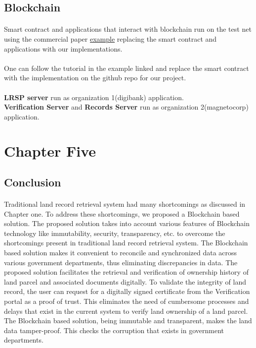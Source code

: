 \documentclass{article}
\begin{document}
        \subsection{Blockchain}
    
        \paragraph{}
        Smart contract and applications that interact with blockchain run on the test net using the commercial paper \href{https://hyperledger-fabric.readthedocs.io/en/latest/tutorial/commercial_paper.html}{example} replacing the smart contract and applications with our implementations.
        
        \paragraph{}
        One can follow the tutorial in the example linked and replace the smart contract with the implementation on the github repo for our project.\\
        \\
        \textbf{LRSP server} run as organization 1(digibank) application.\\
        \textbf{Verification Server} and \textbf{Records Server} run as organization 2(magnetocorp) application.
    

    \section{Chapter Five}
        \subsection{Conclusion}
            \paragraph{}
            Traditional land record retrieval system had many shortcomings as discussed in Chapter one. To address these shortcomings, we proposed a Blockchain based solution. The proposed solution takes into account various features of Blockchain technology like immutability, security, transparency, etc. to overcome the shortcomings present in traditional land record retrieval system. The Blockchain based solution makes it convenient to reconcile and synchronized data across various government departments, thus eliminating discrepancies in data. The proposed solution facilitates the retrieval and verification of ownership history of land parcel and associated documents digitally. To validate the integrity of land record, the user can request for a digitally signed certificate from the Verification portal as a proof of trust. This eliminates the need of cumbersome processes and delays that exist in the current system to verify land ownership of a land parcel. The Blockchain based solution, being immutable and transparent, makes the land data tamper-proof. This checks the corruption that exists in government departments.
        
\end{document}
